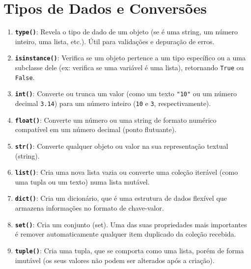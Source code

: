 \documentclass[11pt,a4paper]{article}
\begin{document}
\section{Tipos de Dados e Conversões}
\begin{enumerate}[label=\arabic*., leftmargin=*, resume]
    \item \textbf{\texttt{type()}}: Revela o tipo de dado de um objeto (se é uma string, um número inteiro, uma lista, etc.). Útil para validações e depuração de erros.
    \item \textbf{\texttt{isinstance()}}: Verifica se um objeto pertence a um tipo específico ou a uma subclasse dele (ex: verifica se uma variável é uma lista), retornando \texttt{True} ou \texttt{False}.
    \item \textbf{\texttt{int()}}: Converte ou trunca um valor (como um texto \texttt{"10"} ou um número decimal \texttt{3.14}) para um número inteiro (\texttt{10} e \texttt{3}, respectivamente).
    \item \textbf{\texttt{float()}}: Converte um número ou uma string de formato numérico compatível em um número decimal (ponto flutuante).
    \item \textbf{\texttt{str()}}: Converte qualquer objeto ou valor na sua representação textual (string).
    \item \textbf{\texttt{list()}}: Cria uma nova lista vazia ou converte uma coleção iterável (como uma tupla ou um texto) numa lista mutável.
    \item \textbf{\texttt{dict()}}: Cria um dicionário, que é uma estrutura de dados flexível que armazena informações no formato de chave-valor.
    \item \textbf{\texttt{set()}}: Cria um conjunto (set). Uma das suas propriedades mais importantes é remover automaticamente qualquer item duplicado da coleção recebida.
    \item \textbf{\texttt{tuple()}}: Cria uma tupla, que se comporta como uma lista, porém de forma imutável (os seus valores não podem ser alterados após a criação).
\end{enumerate}
\end{document}
